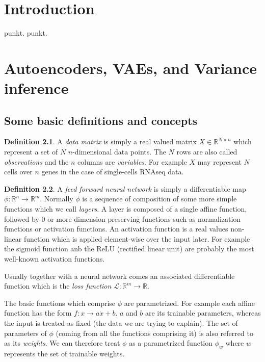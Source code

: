 \documentclass[11pt, a4paper]{report}
\theoremstyle{plain}
\theoremstyle{definition}
\newtheorem{mydef}{Definition}[chapter]
\theoremstyle{remark}
\newcommand{\R}{\mathbb{R}}
\begin{document}
\listoftables

\listoffigures

\tableofcontents

\chapter{Introduction}
punkt.
punkt.

\chapter{Autoencoders, VAEs, and Variance inference}

\section{Some basic definitions and concepts}
\begin{mydef}
\label{def:datamatrix}
A \textit{data matrix} is simply a real valued matrix $X \in \R^{N \times n}$
which represent a set of $N$ $n$-dimensional data points.
The $N$ rows are also called \textit{observations} and the $n$ columns are
\textit{variables}.
For example $X$ may represent $N$ cells over $n$ genes in the case of
single-cells RNAseq data.
\end{mydef}


\begin{mydef}
\label{def:NN}
A \textit{feed forward neural network} is simply a differentiable map $\phi :
\R^n \to \R^m$.
Normally $\phi$ is a sequence of composition of some more simple functions which
we call \textit{layers}. A layer is composed of a single affine function,
followed by $0$ or more dimension preserving functions such as normalization
functions or activation functions. An activation function is a real values
non-linear function which is applied element-wise over the input later.
For example the sigmoid function anb the ReLU (rectified linear unit) are
probably the most well-known activation functions.

\end{mydef}

Usually together with a neural network comes an associated differentiable
function which is the \textit{loss function} $\mathcal{L} : \R^m \to \R$.

The basic functions which comprise $\phi$ are parametrized. For example each
affine function has the form $f:x \to a\dot x + b$. $a$ and $b$ are its
trainable parameters, whereas the input is treated as fixed (the data we are
trying to explain). The set of parameters of $\phi$ (coming from all the
functions comprising it) is also referred to as its \textit{weights}. We can
therefore treat $\phi$ as a parametrized function $\phi_w$ where $w$ represents
the set of trainable weights.
\end{document}
